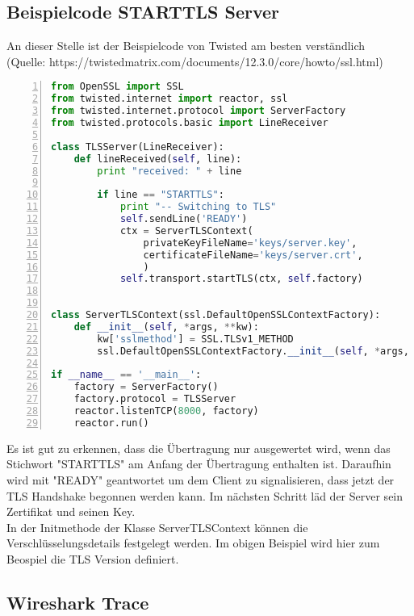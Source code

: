 \subsection{Beispielcode STARTTLS Server}
An dieser Stelle ist der Beispielcode von Twisted am besten verständlich\\
(Quelle: https://twistedmatrix.com/documents/12.3.0/core/howto/ssl.html)\\
\begin{lstlisting}[caption =Testcode Echoserver mit Twisted Framework, language=python, frame=single, breaklines=true,columns=fullflexible, commentstyle=\color{gray}\upshape, captionpos=b, numbers = left]
from OpenSSL import SSL
from twisted.internet import reactor, ssl
from twisted.internet.protocol import ServerFactory
from twisted.protocols.basic import LineReceiver

class TLSServer(LineReceiver):
    def lineReceived(self, line):
        print "received: " + line

        if line == "STARTTLS":
            print "-- Switching to TLS"
            self.sendLine('READY')
            ctx = ServerTLSContext(
                privateKeyFileName='keys/server.key',
                certificateFileName='keys/server.crt',
                )
            self.transport.startTLS(ctx, self.factory)


class ServerTLSContext(ssl.DefaultOpenSSLContextFactory):
    def __init__(self, *args, **kw):
        kw['sslmethod'] = SSL.TLSv1_METHOD
        ssl.DefaultOpenSSLContextFactory.__init__(self, *args, **kw)

if __name__ == '__main__':
    factory = ServerFactory()
    factory.protocol = TLSServer
    reactor.listenTCP(8000, factory)
    reactor.run()
\end{lstlisting}
Es ist gut zu erkennen, dass die Übertragung nur ausgewertet wird, wenn das Stichwort "STARTTLS" am Anfang der Übertragung enthalten ist. Daraufhin wird mit "READY" geantwortet um dem Client zu signalisieren, dass jetzt der TLS Handshake begonnen werden kann. Im nächsten Schritt läd der Server sein Zertifikat und seinen Key. \\
In der Initmethode der Klasse ServerTLSContext können die Verschlüsselungsdetails festgelegt werden. Im obigen Beispiel wird hier zum Beospiel die TLS Version definiert.  \\

\subsection{Wireshark Trace}
